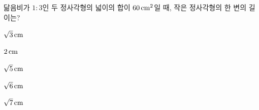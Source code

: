 닮음비가 $1:3$인 두 정사각형의 넓이의 합이 $60\mkern3mu \mathrm{cm}^2$일 때, 작은 정사각형의 한 변의 길이는?
\begin{choices32}{\rule[-3ex]{0pt}{8ex}$\sqrt{3}\mkern3mu \mathrm{cm}$}{\rule[-3ex]{0pt}{8ex}$2\mkern3mu \mathrm{cm}$}{\rule[-3ex]{0pt}{8ex}$\sqrt{5}\mkern3mu \mathrm{cm}$}{\rule[-3ex]{0pt}{8ex}$\sqrt{6}\mkern3mu \mathrm{cm}$}{\rule[-3ex]{0pt}{8ex}$\sqrt{7}\mkern3mu \mathrm{cm}$}\end{choices32}
